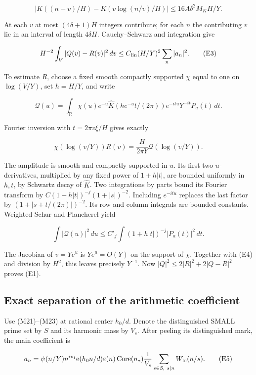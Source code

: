 \[
\left|K((n-v)/H)-K(v\log(n/v)/H)\right|
 \le16A\delta^2M_K H/Y. \tag{E2}
\]

At each \(v\) at most \((4\delta+1)H\) integers contribute; for each
\(n\) the contributing \(v\) lie in an interval of length \(4\delta H\).
Cauchy--Schwarz and integration give

\[
H^{-2}\int_V|Q(v)-R(v)|^2\,dv
 \le C_{\rm lin}(H/Y)^2\sum_n|a_n|^2. \tag{E3}
\]

To estimate \(R\), choose a fixed smooth compactly supported \(\chi\)
equal to one on \(\log(V/Y)\), set \(h=H/Y\), and write

\[
\mathcal Q(u)=\int_{\mathbb R}
 \chi(u)e^{-u}\widehat K(he^{-u}t/(2\pi))
 e^{-itu}Y^{-it}P_a(t)\,dt.
\]

Fourier inversion with \(t=2\pi v\xi/H\) gives exactly

\[
\chi(\log(v/Y))R(v)=\frac H{2\pi Y}
                   \mathcal Q(\log(v/Y)). \tag{E4}
\]

The amplitude is smooth and compactly supported in \(u\). Its first two
\(u\)-derivatives, multiplied by any fixed power of \(1+h|t|\), are
bounded uniformly in \(h,t\), by Schwartz decay of \(\widehat K\). Two
integrations by parts bound its Fourier transform by
\(C(1+h|t|)^{-j}(1+|s|)^{-2}\). Including \(e^{-itu}\) replaces the last
factor by \((1+|s+t/(2\pi)|)^{-2}\). Its row and column integrals are
bounded constants. Weighted Schur and Plancherel yield

\[
\int|\mathcal Q(u)|^2\,du
 \le C'_j\int(1+h|t|)^{-j}|P_a(t)|^2\,dt.
\]

The Jacobian of \(v=Ye^u\) is \(Ye^u=O(Y)\) on the support of \(\chi\).
Together with (E4) and division by \(H^2\), this leaves precisely
\(Y^{-1}\). Now \(|Q|^2\le2|R|^2+2|Q-R|^2\) proves (E1).


\hypertarget{local-energy-exact-separation-of-the-arithmetic-coefficient}{%
\subsection{Exact separation of the arithmetic
coefficient}\label{local-energy-exact-separation-of-the-arithmetic-coefficient}}

Use (M21)--(M23) at rational center \(h_0/d\). Denote the distinguished
SMALL prime set by \(S\) and its harmonic mass by \(V_s\). After peeling
its distinguished mark, the main coefficient is

\[
a_n=\psi(n/Y)n^{iv_1}\mathrm e(h_0n/d)\varepsilon(n)
 \operatorname{Core}(n_*)\frac1{V_s}
 \sum_{s\in S,\ s\mid n}W_{\rm lo}(n/s).
\tag{E5}
\]

